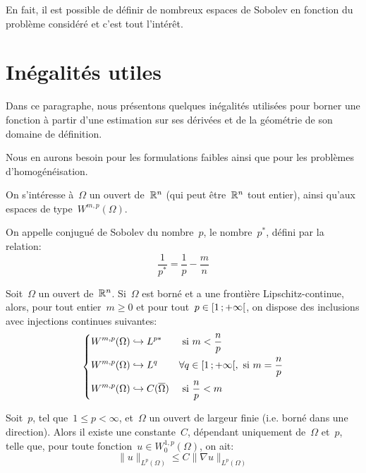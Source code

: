 \medskip
En fait, il est possible de définir de nombreux espaces de Sobolev en fonction du problème considéré et c'est tout l'intérêt.

\medskip
\section{Inégalités utiles}
Dans ce paragraphe, nous présentons quelques inégalités utilisées pour borner une fonction à partir d'une estimation sur ses dérivées et de la géométrie de son domaine de définition.

Nous en aurons besoin pour les formulations faibles ainsi que pour les problèmes d'homogénéisation.
\medskip
\begin{definition}
On s'intéresse à~$\Omega$ un ouvert de~$\mathbb R^n$ (qui peut être~$\mathbb R^n$ tout entier), ainsi qu'aux espaces de type~$W^{m,p}(\Omega)$.

On appelle conjugué de Sobolev du nombre~$p$, le nombre~$p^*$, défini par la relation:
\begin{equation}
  \frac{1}{p^*} = \frac{1}{p} - \frac{m}{n}
\end{equation}
\end{definition}
\begin{theoreme}
Soit~$\Omega$ un ouvert de~$\mathbb R^n$. Si~$\Omega$ est borné et a une frontière Lipschitz-continue, alors, pour tout entier~$m\ge 0$ et pour tout~$p\in\mathopen{[}1\,;+\infty\mathclose{[}$, on dispose des inclusions avec injections continues suivantes:
\begin{equation}
\left\{\begin{aligned}
&W^{m,p}(\Omega) \hookrightarrow L^{p*} && \text{ si } m<\frac{n}p\\
&W^{m,p}(\Omega) \hookrightarrow L^q && \forall q\in\mathopen{[}1\,;+\infty\mathclose{[}, \text{ si } m=\frac{n}p\\
&W^{m,p}(\Omega) \hookrightarrow C(\overline{\Omega}) && \text{ si } \frac{n}p<m
\end{aligned}\right.
\end{equation}
\end{theoreme}


\medskip
\begin{theoreme}
Soit~$p$, tel que~$1 \le p <\infty$, et~$\Omega$ un ouvert de largeur finie
(i.e. borné dans une direction).
Alors il existe une constante~$C$, dépendant uniquement de~$\Omega$ et~$p$, telle que, pour toute fonction~$u\in W_0^{1,p}(\Omega)$, on ait:
\begin{equation}
\|u\|_{L^p(\Omega)} \le C \|\nabla u\|_{L^p(\Omega)}
\end{equation}
\end{theoreme}


